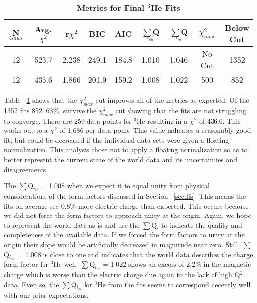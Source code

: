 \vspace{6mm}
\begin{table}[!h]
\centering
\begin{tabular}{|c c c c c c c c c|}
\hline
\textbf{N$_{Gaus}$} & \textbf{Avg. $\chi^2$} & \textbf{r$\chi^2$} & \textbf{BIC} & \textbf{AIC} & \textbf{$\sum$Q$_{i_{ch}}$} & \textbf{$\sum$Q$_{i_{m}}$} & \textbf{$\chi^2_{max}$} & \makecell{\textbf{Below}\\ \textbf{Cut}} \\
\hline
12 & 523.7 & 2.238 & 249.1 & 184.8 & 1.010 & 1.046 & No Cut & 1352\\
12 & 436.6 & 1.866 & 201.9 & 159.2 & 1.008 & 1.022 & 500 & 852\\
\hline
\end{tabular}
\caption{\bf{Metrics for Final $^3$He Fits}}
\label{tab:3he_fits}
\end{table}

Table ~\ref{tab:3he_fits} shows that the $\chi^2_{max}$ cut improves all of the metrics as expected. Of the 1352 fits 852, 63$\%$, survive the $\chi^2_{max}$ cut showing that the fits are not struggling to converge. There are 259 data points for $^3$He resulting in a $\chi^2$ of 436.6. This works out to a $\chi^2$ of 1.686 per data point. This value indicates a reasonably good fit, but could be decreased if the individual data sets were given a floating normalization. This analysis chose not to apply a floating normalization so as to better represent the current state of the world data and its uncertainties and disagreements.%

The $\sum$Q$_{i_{ch}}$ = 1.008 when we expect it to equal unity from physical considerations of the form factors discussed in Section ~\ref{sec:ffs}. This means the fits on average see 0.8$\%$ more electric charge than expected. This occurs because we did not force the form factors to approach unity at the origin. Again, we hope to represent the world data as is and use the $\sum$Q$_{i}$ to indicate the quality and completeness of the available data. If we forced the form factors to unity at the origin their slope would be artificially decreased in magnitude near zero. Still, $\sum$Q$_{i_{ch}}$ = 1.008 is close to one and indicates that the world data describes the charge form factor for $^3$He well. $\sum$Q$_{i_{m}}$ = 1.022 shows an excess of 2.2$\%$ in the magnetic charge which is worse than the electric charge due again to the lack of high Q$^2$ data. Even so, the $\sum$Q$_{i_{m}}$ for $^3$He from the fits seems to correspond decently well with our prior expectations. %

